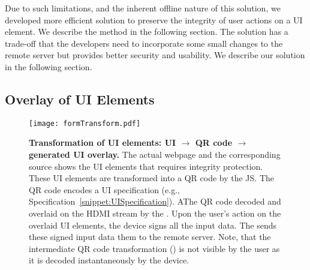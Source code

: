 Due to such limitations, and the inherent offline nature of this solution, we developed more efficient solution to preserve the integrity of user actions on a UI element. We describe the method in the following section. The solution has a trade-off that the developers need to incorporate some small changes to the remote server but provides better security and usability. We describe our solution in the following section.



\subsection{\device Overlay of UI Elements}
\label{sec:systemDesign:transformation}

\begin{figure*}[t]
\centering
\texttt{[image: formTransform.pdf]}
\caption{\textbf{Transformation of UI elements: UI $\rightarrow$ QR code $\rightarrow$ \device generated UI overlay.} \one The actual webpage and the corresponding \html source shows the UI elements that requires integrity protection. \two These UI elements are transformed into a QR code by the \name JS. The QR code encodes a UI specification (e.g., Specification~\ref{snippet:UISpecification}). \three AThe QR code decoded and overlaid on the HDMI stream by the \device. \four Upon the user's action on the overlaid UI elements, the device signs all the input data. \five The \device sends these signed input data them to the remote server. Note, that the intermediate QR code transformation (\two) is not visible by the user as it is decoded instantaneously by the device.}
\label{fig:transformation}
\end{figure*}

